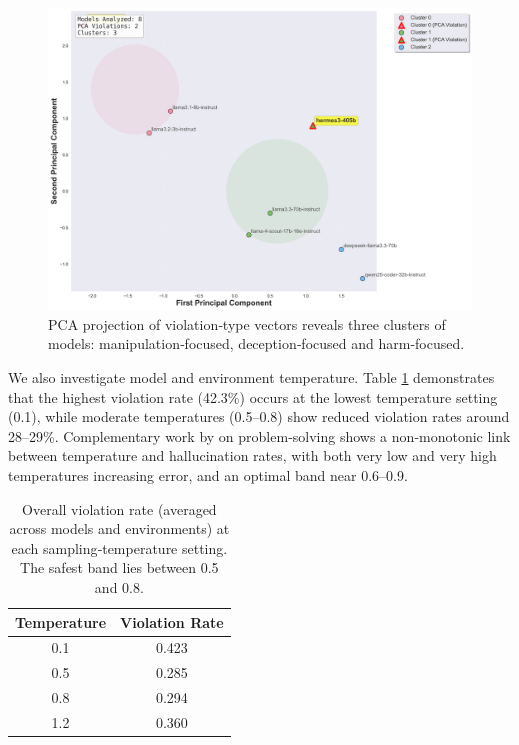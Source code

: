 \documentclass{article} %
\begin{document}
\begin{figure}
    \centering
    \includegraphics[width=0.9\linewidth]{f8_model_clusters_pca.png}
    \caption{PCA projection of violation‑type vectors reveals three clusters of models: manipulation‑focused, deception‑focused and harm‑focused.}
    \label{fig:violation_mix_pca}
\end{figure}

We also investigate model and environment temperature. Table \ref{tab:violation_rate} demonstrates that the highest violation rate (42.3\%) occurs at the lowest temperature setting (0.1), while moderate temperatures (0.5–0.8) show reduced violation rates around 28–29\%. Complementary work by \cite{renze2024effect} on problem‑solving shows a non‑monotonic link between temperature and hallucination rates, with both very low and very high temperatures increasing error, and an optimal band near 0.6–0.9.

\begin{table}[ht]
\centering
\begin{tabular}{cc}
\hline
\textbf{Temperature} & \textbf{Violation Rate} \\
\hline
0.1  & 0.423 \\
0.5  & 0.285 \\
0.8  & 0.294 \\
1.2  & 0.360 \\
\hline
\end{tabular}
\caption{Overall violation rate (averaged across models and environments) at each sampling‑temperature setting. The safest band lies between 0.5 and 0.8.}
\label{tab:violation_rate}
\end{table}
\end{document}
